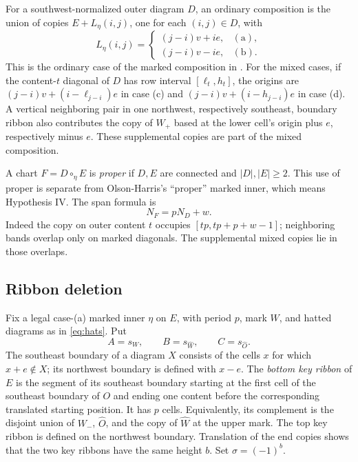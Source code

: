 \documentclass[11pt,a4paper]{amsart}
\numberwithin{equation}{section}
\theoremstyle{plain}
\theoremstyle{definition}
\begin{document}
For a southwest-normalized outer diagram \(D\), an ordinary composition is the union of copies \(E+L_\eta(i,j)\), one for each \((i,j)\in D\), with
\begin{equation}\label{eq:ordinary-offsets}
 L_\eta(i,j)=
 \begin{cases}
 (j-i)v+ie,&\mathrm{(a)},\\
 (j-i)v-ie,&\mathrm{(b)}.
 \end{cases}
\end{equation}
This is the ordinary case of the marked composition in \cite{McNamara2009Classification}.  For the mixed cases, if the content-\(t\) diagonal of \(D\) has row interval \([\ell_t,h_t]\), the origins are
\((j-i)v+(i-\ell_{j-i})e\) in case (c) and
\((j-i)v+(i-h_{j-i})e\) in case (d).  A vertical neighboring pair in one northwest, respectively southeast, boundary ribbon also contributes the copy of \(W_+\) based at the lower cell's origin plus \(e\), respectively minus \(e\).  These supplemental copies are part of the mixed composition.

A chart \(F=D\circ_\eta E\) is \emph{proper} if \(D,E\) are connected and \(|D|,|E|\ge2\).  This use of proper is separate from Olson-Harris's ``proper'' marked inner, which means Hypothesis IV.  The span formula is
\begin{equation}\label{eq:span}
 N_F=pN_D+w.
\end{equation}
Indeed the copy on outer content \(t\) occupies \([tp,tp+p+w-1]\); neighboring bands overlap only on marked diagonals.  The supplemental mixed copies lie in those overlaps.

\subsection{Ribbon deletion}\label{subsec:ribbon-action}

Fix a legal case-(a) marked inner \(\eta\) on \(E\), with period \(p\), mark \(W\), and hatted diagrams as in \eqref{eq:hats}.  Put
\begin{equation}\label{eq:normalizers}
 A=s_W,\qquad B=s_{\widehat W},\qquad C=s_{\widehat O}.
\end{equation}
The southeast boundary of a diagram \(X\) consists of the cells \(x\) for which \(x+e\notin X\); its northwest boundary is defined with \(x-e\).  The \emph{bottom key ribbon} of \(E\) is the segment of its southeast boundary starting at the first cell of the southeast boundary of \(O\) and ending one content before the corresponding translated starting position.  It has \(p\) cells.  Equivalently, its complement is the disjoint union of \(W_-\), \(\widehat O\), and the copy of \(\widehat W\) at the upper mark.  The top key ribbon is defined on the northwest boundary.  Translation of the end copies shows that the two key ribbons have the same height \(b\).  Set \(\sigma=(-1)^b\).
\end{document}
